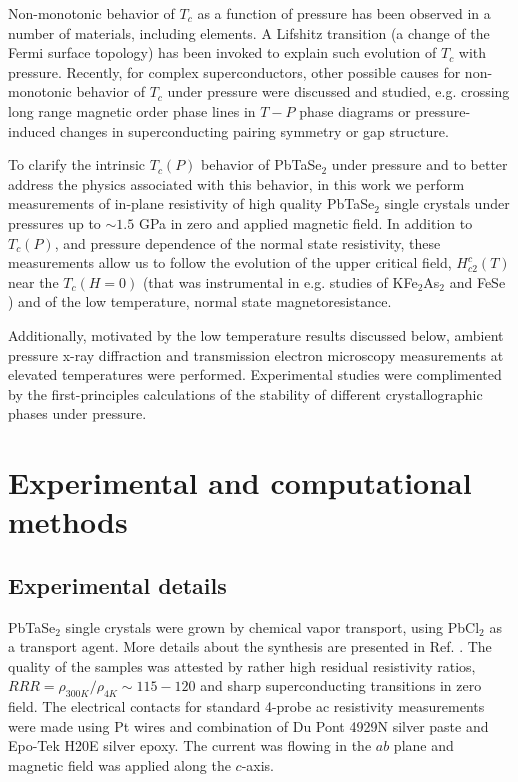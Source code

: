 \documentclass[aps,prb,preprint,groupedaddress,showpacs,amsmath,amssymb]{revtex4}
\begin{document}
Non-monotonic behavior of $T_c$ as a function of pressure has been observed in a number of materials, including elements. \cite{hat56a,jen58a,chu68a} A Lifshitz transition (a change of the Fermi surface topology) \cite{lif60a} has been invoked to explain such evolution of $T_c$ with pressure. \cite{mak65a} Recently, for complex superconductors, other possible causes for non-monotonic behavior of $T_c$ under pressure were discussed and studied, e.g. crossing long range magnetic order phase lines in $T - P$ phase diagrams \cite{has12a,bud14a,bud15a,ben10a,ben12a,kal16a} or pressure-induced changes in superconducting pairing symmetry or gap structure. \cite{taf13a,ter14a,tau14a,taf15a} 

To clarify the intrinsic $T_c(P)$ behavior of PbTaSe$_2$ under pressure and to better address the physics associated with this behavior, in this work we perform measurements of in-plane resistivity of high quality PbTaSe$_2$ single crystals under pressures up to $\sim 1.5$ GPa in zero and applied magnetic field. In addition to $T_c(P)$, and pressure dependence of the normal state resistivity, these measurements allow us to follow the evolution of the upper critical field, $H_{c2}^c(T)$ near the $T_c(H = 0)$ (that was instrumental in e.g. studies of KFe$_2$As$_2$ and FeSe \cite{tau14a,taf15a,kal16a}) and of the low temperature, normal state magnetoresistance.

Additionally, motivated by the low temperature results discussed below, ambient pressure x-ray diffraction and transmission electron microscopy  measurements at elevated temperatures were performed. Experimental studies were complimented by the first-principles calculations of the stability of different crystallographic phases under pressure.


\section{Experimental and computational methods}

\subsection{Experimental details}

PbTaSe$_2$ single crystals were grown by chemical vapor transport,  using PbCl$_2$ as a transport agent. More details about the synthesis are presented in Ref. . The quality of the samples was attested by rather high residual resistivity ratios, $RRR = \rho_{300K}/\rho_{4K} \sim 115-120$ and sharp superconducting transitions in zero field.  The electrical contacts for standard 4-probe ac resistivity measurements were made using Pt wires and combination of Du Pont 4929N silver paste and Epo-Tek H20E silver epoxy. The current was flowing in the $ab$ plane and magnetic field was applied along the $c$-axis. 
\end{document}
